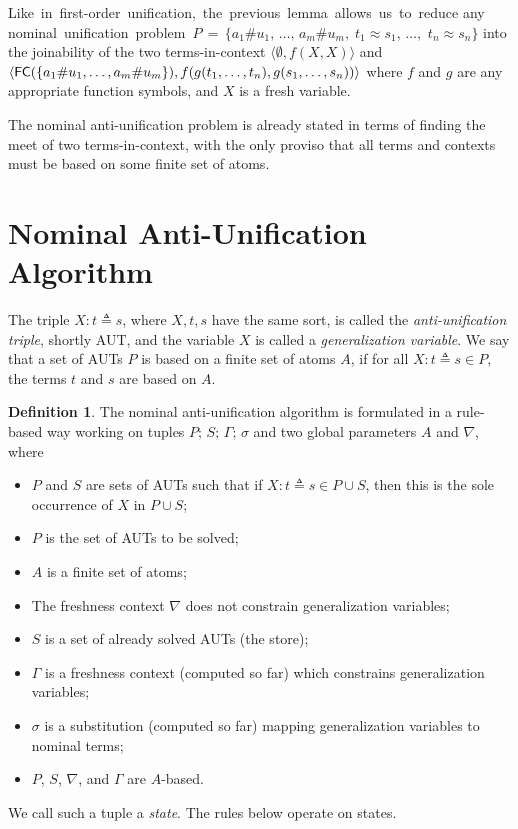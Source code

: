 \documentclass[11pt,a4paper]{amsart}
\theoremstyle{definition}
\newtheorem{definition}{Definition}
\newcommand{\np}[2]{\langle #1, \allowbreak #2\rangle}
\newcommand{\Atoms}{A}
\newcommand{\nablai}{{\nabla}}
\newcommand{\nablag}{\Gamma}
\newcommand{\fe}{{\sf FC}}
\begin{document}
Like\, in\, first-order\, unification,\, the\, previous\, lemma\, allows\, us\, to\,
reduce any\, nominal\, unification\, problem\,
$P\,=\,\{a_1\#u_1,\,\dots,\,a_m\#u_m,\;t_1\approx s_1,\,\dots,$ $t_n\approx s_n\}$
into the joinability of the two terms-in-context
$\np{\emptyset}{f(X,X)}$ and
$\np{\fe(\allowbreak\{a_1\#u_1,\dots,\allowbreak a_m\#u_m\})}{f(g(t_1,\dots,t_n),g(s_1,\dots, \allowbreak s_n))}$
where $f$ and $g$ are any appropriate function symbols, and $X$ is a
fresh variable.

The nominal anti-unification problem is already stated in terms of
finding the meet of two terms-in-context, with the only proviso that
all terms and contexts must be based on some finite set of atoms.



\section{Nominal Anti-Unification Algorithm}
\label{sect:nau:alg}

The triple $X: t \triangleq s$, where $X,t,s$ have the same sort, is
called the \emph{anti-unification triple}, shortly AUT, and the
variable $X$ is called a \emph{generalization variable}. We say that
a set of AUTs $P$ is based on a finite set of atoms $A$, if for all ${
  X: t \triangleq s}\in P$, the terms $t$ and $s$ are based on $A$.



\begin{definition}
The nominal anti-unification algorithm is formulated in a rule-based
way working on tuples 
$P;\, S;\, \nablag;\,\sigma$ and two global parameters
  $\Atoms$ and $\nablai$, where
\begin{itemize}
 \item $P$ and $S$ are sets of AUTs such that if ${ X: t \triangleq s}
   \in P\cup S$, then this is the sole occurrence of $ X$ in $ P\cup
   S$;
 \item $P$ is the set of AUTs to be solved;
 \item $\Atoms$ is a finite set of atoms;
 \item The freshness context $ \nablai$ does not constrain generalization variables;
 \item $S$ is a set of already solved AUTs (the store);
 \item $\nablag$ is a freshness context (computed so far) which
   constrains generalization variables;
 \item $\sigma$ is a substitution (computed so far) mapping
   generalization variables to nominal terms;
 \item $P$, $S$, $\nablai$, and $\nablag$ are $\Atoms$-based.
\end{itemize}

We call such a tuple a \emph{state}. The rules below operate on
states.

\end{definition}
\end{document}
